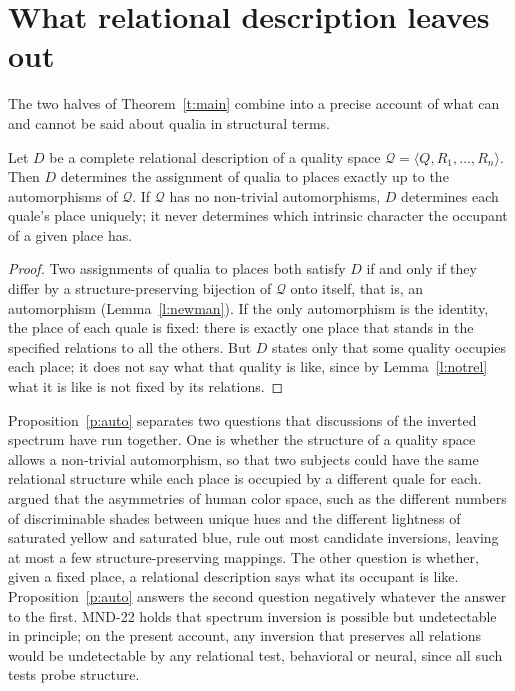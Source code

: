 \documentclass{situationist-preprint}
\begin{document}
\section{What relational description leaves out}

The two halves of Theorem~\ref{t:main} combine into a precise account of what can and cannot be said about qualia in structural terms.

\begin{proposition}\label{p:auto}
Let $D$ be a complete relational description of a quality space $\mathcal{Q} = \langle Q, R_1, \ldots, R_n\rangle$. Then $D$ determines the assignment of qualia to places exactly up to the automorphisms of $\mathcal{Q}$. If $\mathcal{Q}$ has no non-trivial automorphisms, $D$ determines each quale's place uniquely; it never determines which intrinsic character the occupant of a given place has.
\end{proposition}

\begin{proof}
Two assignments of qualia to places both satisfy $D$ if and only if they differ by a structure-preserving bijection of $\mathcal{Q}$ onto itself, that is, an automorphism (Lemma~\ref{l:newman}). If the only automorphism is the identity, the place of each quale is fixed: there is exactly one place that stands in the specified relations to all the others. But $D$ states only that some quality occupies each place; it does not say what that quality is like, since by Lemma~\ref{l:notrel} what it is like is not fixed by its relations.
\end{proof}

Proposition~\ref{p:auto} separates two questions that discussions of the inverted spectrum have run together. One is whether the structure of a quality space allows a non-trivial automorphism, so that two subjects could have the same relational structure while each place is occupied by a different quale for each. \citet{Palmer1999} argued that the asymmetries of human color space, such as the different numbers of discriminable shades between unique hues and the different lightness of saturated yellow and saturated blue, rule out most candidate inversions, leaving at most a few structure-preserving mappings. The other question is whether, given a fixed place, a relational description says what its occupant is like. Proposition~\ref{p:auto} answers the second question negatively whatever the answer to the first. MND-22 holds that spectrum inversion is possible but undetectable in principle; on the present account, any inversion that preserves all relations would be undetectable by any relational test, behavioral or neural, since all such tests probe structure.
\end{document}
